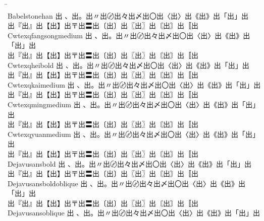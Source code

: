 \begin{tabbing}
\phantom{XXXXXXXXXXXXXXXXXXXXXXXXX} \= \phantom{XXXXXXXXXXXXXXXXXXXXXXXXXXXXXXXXXXXXXXXXXXXXXXXXXXXXXXXXXXXX} \\
Babelstonehan \> {\mktsFontfileBabelstonehan{}出 、出。出〃出〄出々出〆出〇出〈出〉出《出》出「出」出}\\
\> {\mktsFontfileBabelstonehan{}出『出』出【出】出〒出〓出〔出〕出〖出〗出〘出〙出〚出} \\
Cwtexqfangsongmedium \> {\mktsFontfileCwtexqfangsongmedium{}出 、出。出〃出〄出々出〆出〇出〈出〉出《出》出「出」出}\\
\> {\mktsFontfileCwtexqfangsongmedium{}出『出』出【出】出〒出〓出〔出〕出〖出〗出〘出〙出〚出} \\
Cwtexqheibold \> {\mktsFontfileCwtexqheibold{}出 、出。出〃出〄出々出〆出〇出〈出〉出《出》出「出」出}\\
\> {\mktsFontfileCwtexqheibold{}出『出』出【出】出〒出〓出〔出〕出〖出〗出〘出〙出〚出} \\
Cwtexqkaimedium \> {\mktsFontfileCwtexqkaimedium{}出 、出。出〃出〄出々出〆出〇出〈出〉出《出》出「出」出}\\
\> {\mktsFontfileCwtexqkaimedium{}出『出』出【出】出〒出〓出〔出〕出〖出〗出〘出〙出〚出} \\
Cwtexqmingmedium \> {\mktsFontfileCwtexqmingmedium{}出 、出。出〃出〄出々出〆出〇出〈出〉出《出》出「出」出}\\
\> {\mktsFontfileCwtexqmingmedium{}出『出』出【出】出〒出〓出〔出〕出〖出〗出〘出〙出〚出} \\
Cwtexqyuanmedium \> {\mktsFontfileCwtexqyuanmedium{}出 、出。出〃出〄出々出〆出〇出〈出〉出《出》出「出」出}\\
\> {\mktsFontfileCwtexqyuanmedium{}出『出』出【出】出〒出〓出〔出〕出〖出〗出〘出〙出〚出} \\
Dejavusansbold \> {\mktsFontfileDejavusansbold{}出 、出。出〃出〄出々出〆出〇出〈出〉出《出》出「出」出}\\
\> {\mktsFontfileDejavusansbold{}出『出』出【出】出〒出〓出〔出〕出〖出〗出〘出〙出〚出} \\
Dejavusansboldoblique \> {\mktsFontfileDejavusansboldoblique{}出 、出。出〃出〄出々出〆出〇出〈出〉出《出》出「出」出}\\
\> {\mktsFontfileDejavusansboldoblique{}出『出』出【出】出〒出〓出〔出〕出〖出〗出〘出〙出〚出} \\
Dejavusansoblique \> {\mktsFontfileDejavusansoblique{}出 、出。出〃出〄出々出〆出〇出〈出〉出《出》出「出」出}\\

\end{tabbing}
